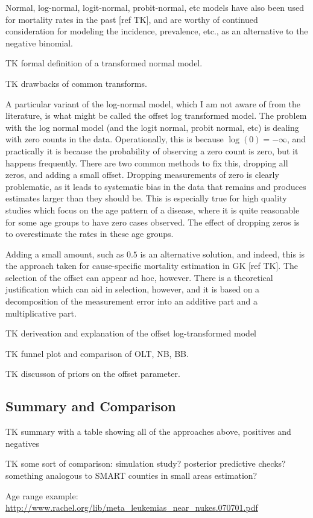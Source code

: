 Normal, log-normal, logit-normal, probit-normal, etc models have also
been used for mortality rates in the past [ref TK], and are worthy of
continued consideration for modeling the incidence, prevalence, etc.,
as an alternative to the negative binomial.

TK formal definition of a transformed normal model.

TK drawbacks of common transforms.

A particular variant of the log-normal model, which I am not aware of
from the literature, is what might be called the offset log
transformed model.  The problem with the log normal model (and the
logit normal, probit normal, etc) is dealing with zero counts in the
data.  Operationally, this is because $\log(0) = -\infty$, and
practically it is because the probability of observing a zero
count is zero, but it happens frequently.  There are two common
methods to fix this, dropping all zeros, and adding a small offset.
Dropping measurements of zero is clearly problematic, as it leads to
systematic bias in the data that remains and produces estimates larger
than they should be.  This is especially true for high quality studies
which focus on the age pattern of a disease, where it is quite
reasonable for some age groups to have zero cases observed.  The
effect of dropping zeros is to overestimate the rates in these age
groups.

Adding a small amount, such as $0.5$ is an alternative solution, and
indeed, this is the approach taken for cause-specific mortality estimation
in GK [ref TK].  The selection of the offset can appear ad hoc,
however.  There is a theoretical justification which can aid in
selection, however, and it is based on a decomposition of the
measurement error into an additive part and a multiplicative part.

TK deriveation and explanation of the offset log-transformed model

TK funnel plot and comparison of OLT, NB, BB.

TK discusson of priors on the offset parameter.

\subsection{Summary and Comparison}
TK summary with a table showing all of the approaches above, positives
and negatives

TK some sort of comparison: simulation study? posterior predictive
checks? something analogous to SMART counties in small areas
estimation?

Age range example:
\url{
http://www.rachel.org/lib/meta_leukemias_near_nukes.070701.pdf
}
